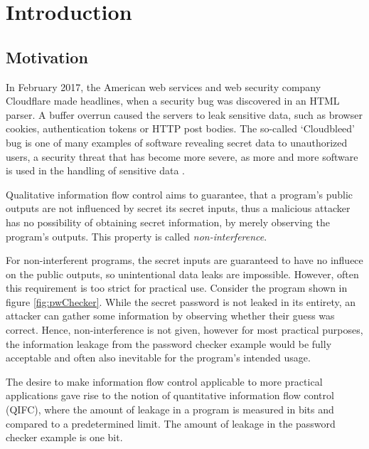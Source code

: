 \chapter{Introduction}\label{sec:intro}

\section{Motivation}

In February 2017, the American web services and web security company Cloudflare made headlines, when a security bug was discovered in an HTML parser. A buffer overrun caused the servers to leak sensitive data, such as browser cookies, authentication tokens or HTTP post bodies. The so-called `Cloudbleed' bug is one of many examples of software revealing secret data to unauthorized users, a security threat that has become more severe, as more and more software is used in the handling of sensitive data \cite{cloudbleedIssue, cloudbleedReport}. 

Qualitative information flow control aims to guarantee, that a program's public outputs are not influenced by secret its secret inputs, thus a malicious attacker has no possibility of obtaining secret information, by merely observing the program's outputs. This property is called \emph{non-interference}. 

For non-interferent programs, the secret inputs are guaranteed to have no influece on the public outputs, so unintentional data leaks are impossible. However, often this requirement is too strict for practical use. Consider the program shown in figure \ref{fig:pwChecker}. While the secret password is not leaked in its entirety, an attacker can gather some information by observing whether their guess was correct. Hence, non-interference is not given, however for most practical purposes, the information leakage from the password checker example would be fully acceptable and often also inevitable for the program's intended usage.

The desire to make information flow control applicable to more practical applications gave rise to the notion of quantitative information flow control (QIFC), where the amount of leakage in a program is measured in bits and compared to a predetermined limit. The amount of leakage in the password checker example is one bit.


